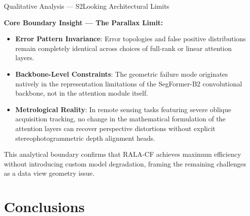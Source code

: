 \documentclass[aspectratio=169]{beamer}
\begin{document}
\begin{frame}{Qualitative Analysis — S2Looking Architectural Limits}

\vskip 0.4cm
\textbf{\color{red!80!black}Core Boundary Insight — The Parallax Limit:}
\vskip 0.3cm

\begin{itemize}
  \item \textbf{Error Pattern Invariance}: Error topologies and false positive distributions remain completely identical across choices of full-rank or linear attention layers.
  \item \textbf{Backbone-Level Constraints}: The geometric failure mode originates natively in the representation limitations of the SegFormer-B2 convolutional backbone, not in the attention module itself.
  \item \textbf{Metrological Reality}: In remote sensing tasks featuring severe oblique acquisition tracking, no change in the mathematical formulation of the attention layers can recover perspective distortions without explicit stereophotogrammetric depth alignment heads.
\end{itemize}

\vskip 0.6cm
\centering
\footnotesize\color{charcoal}
This analytical boundary confirms that RALA-CF achieves maximum efficiency without introducing custom model degradation, framing the remaining challenges as a data view geometry issue.

\end{frame}

\section{Conclusions}
\end{document}
